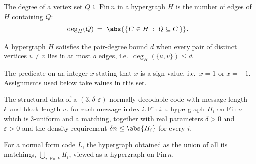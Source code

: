 \begin{definition}
\label{Hypergraph.degree}
\leanok
{}
The degree of a vertex set $Q \subseteq \mathrm{Fin}\,n$ in a hypergraph $H$ is the
number of edges of $H$ containing $Q$:
\[
  \deg_H(Q) \;=\; \abs{\{\, C \in H \;:\; Q \subseteq C \,\}}.
\]
\end{definition}

\begin{definition}
\label{Hypergraph.pairDegreeBound}
\leanok
{}
A hypergraph $H$ satisfies the pair-degree bound $d$ when every pair of distinct
vertices $u \neq v$ lies in at most $d$ edges, i.e.\ $\deg_H(\{u,v\}) \le d$.
\end{definition}

\begin{definition}
\label{IsPMOne}
\leanok
The predicate on an integer $x$ stating that $x$ is a sign value, i.e.\ $x = 1$ or
$x = -1$. Assignments used below take values in this set.
\end{definition}

\begin{definition}
\label{NormalLDC}
\leanok
{}
The structural data of a $(3,\delta,\varepsilon)$-normally decodable code with message
length $k$ and block length $n$: for each message index $i : \mathrm{Fin}\,k$ a
hypergraph $H_i$ on $\mathrm{Fin}\,n$ which is $3$-uniform and a matching, together
with real parameters $\delta > 0$ and $\varepsilon > 0$ and the density requirement
$\delta n \le \abs{H_i}$ for every $i$.
\end{definition}

\begin{definition}
\label{NormalLDC.combined}
\leanok
{}
For a normal form code $L$, the hypergraph obtained as the union of all its matchings,
$\bigcup_{i : \mathrm{Fin}\,k} H_i$, viewed as a hypergraph on $\mathrm{Fin}\,n$.
\end{definition}

